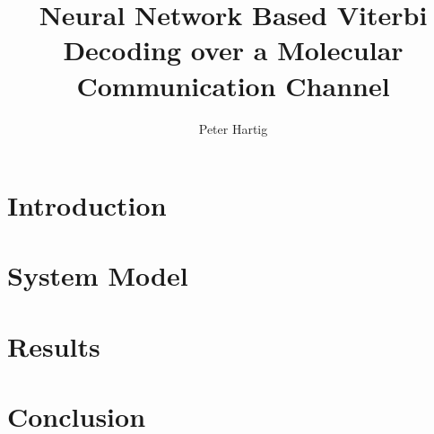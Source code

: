 \documentclass[12pt,a4paper]{report}
\title{Neural Network Based Viterbi Decoding over a Molecular Communication Channel}
\author{Peter Hartig}
\begin{document}
\maketitle

\begin{abstract}

\end{abstract}

\newpage
\tableofcontents
\newpage

\section{Introduction}

\section{System Model}

\section{Results}

\section{Conclusion}

\newpage

\end{document}
